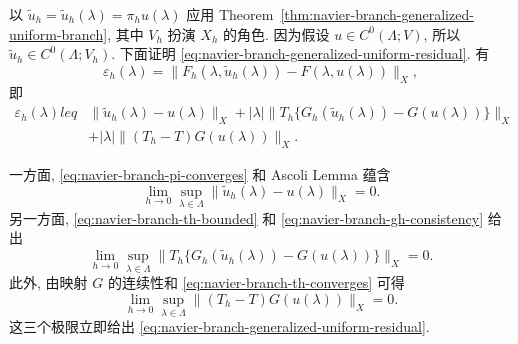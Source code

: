 \begin{Proof}
以 $\widetilde u_h=\widetilde u_h(\lambda)=\pi_hu(\lambda)$ 应用
Theorem~\ref{thm:navier-branch-generalized-uniform-branch}, 其中 $V_h$ 扮演 $X_h$
的角色. 因为假设 $u\in C^0(\Lambda;V)$, 所以
$\widetilde u_h\in C^0(\Lambda;V_h)$. 下面证明
\eqref{eq:navier-branch-generalized-uniform-residual}. 有
\[
\varepsilon_h(\lambda)=
\|F_h(\lambda,\widetilde u_h(\lambda))-F(\lambda,u(\lambda))\|_X,
\]
即
\begin{equation}\label{eq:navier-branch-nondifferentiable-residual-bound}
\begin{aligned}
\varepsilon_h(\lambda)leq
&\|\widetilde u_h(\lambda)-u(\lambda)\|_X
+|\lambda|\|T_h\{G_h(\widetilde u_h(\lambda))-G(u(\lambda))\}\|_X\\
&+|\lambda|\|(T_h-T)G(u(\lambda))\|_X.
\end{aligned}
\end{equation}

一方面, \eqref{eq:navier-branch-pi-converges} 和 Ascoli Lemma 蕴含
\[
\lim_{h\to0}\sup_{\lambda\in\Lambda}
\|\widetilde u_h(\lambda)-u(\lambda)\|_X=0.
\]
另一方面, \eqref{eq:navier-branch-th-bounded} 和
\eqref{eq:navier-branch-gh-consistency} 给出
\[
\lim_{h\to0}\sup_{\lambda\in\Lambda}
\|T_h\{G_h(\widetilde u_h(\lambda))-G(u(\lambda))\}\|_X=0.
\]
此外, 由映射 $G$ 的连续性和 \eqref{eq:navier-branch-th-converges} 可得
\[
\lim_{h\to0}\sup_{\lambda\in\Lambda}
\|(T_h-T)G(u(\lambda))\|_X=0.
\]
这三个极限立即给出 \eqref{eq:navier-branch-generalized-uniform-residual}.


\end{Proof}
